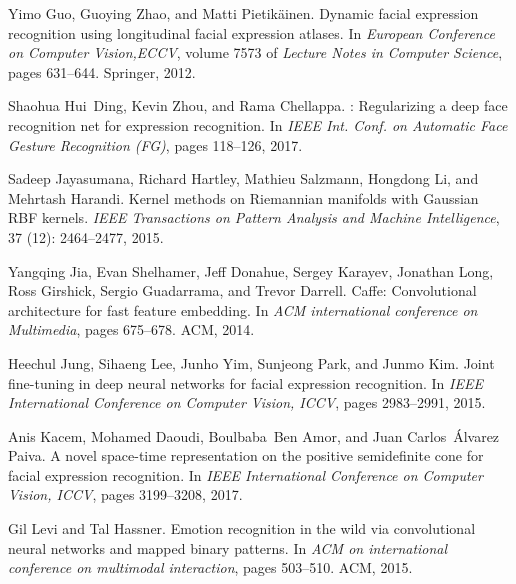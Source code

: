\documentclass{bmvc2k}
\begin{document}
\begin{thebibliography}{29}
Yimo Guo, Guoying Zhao, and Matti Pietik{\"{a}}inen.
\newblock Dynamic facial expression recognition using longitudinal facial
  expression atlases.
\newblock In \emph{European Conference on Computer Vision,{ECCV}}, volume 7573
  of \emph{Lecture Notes in Computer Science}, pages 631--644. Springer, 2012.

Shaohua Hui~Ding, Kevin Zhou, and Rama Chellappa.
: Regularizing a deep face recognition net for
  expression recognition.
\newblock In \emph{IEEE Int. Conf. on Automatic Face Gesture Recognition (FG)},
  pages 118--126, 2017.

Sadeep Jayasumana, Richard Hartley, Mathieu Salzmann, Hongdong Li, and Mehrtash
  Harandi.
\newblock Kernel methods on {R}iemannian manifolds with {G}aussian {RBF}
  kernels.
\newblock \emph{IEEE Transactions on Pattern Analysis and Machine
  Intelligence}, 37 (12): 2464--2477, 2015.

Yangqing Jia, Evan Shelhamer, Jeff Donahue, Sergey Karayev, Jonathan Long, Ross
  Girshick, Sergio Guadarrama, and Trevor Darrell.
\newblock Caffe: Convolutional architecture for fast feature embedding.
\newblock In \emph{ACM international conference on Multimedia}, pages 675--678.
  ACM, 2014.

Heechul Jung, Sihaeng Lee, Junho Yim, Sunjeong Park, and Junmo Kim.
\newblock Joint fine-tuning in deep neural networks for facial expression
  recognition.
\newblock In \emph{{IEEE} International Conference on Computer Vision, {ICCV}},
  pages 2983--2991, 2015.

Anis Kacem, Mohamed Daoudi, Boulbaba~Ben Amor, and Juan Carlos~{\'{A}}lvarez
  Paiva.
\newblock A novel space-time representation on the positive semidefinite cone
  for facial expression recognition.
\newblock In \emph{{IEEE} International Conference on Computer Vision, {ICCV}},
  pages 3199--3208, 2017.

Gil Levi and Tal Hassner.
\newblock Emotion recognition in the wild via convolutional neural networks and
  mapped binary patterns.
\newblock In \emph{ACM on international conference on multimodal interaction},
  pages 503--510. ACM, 2015.


\end{thebibliography}
\end{document}

